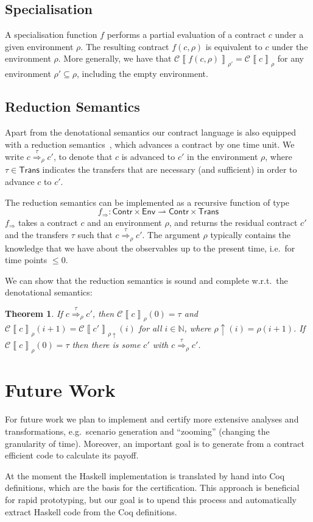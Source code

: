 \documentclass[a4paper,debug,twocolumn]{easychair}
\newcommand\type[1]{\mathsf{#1}}
\newcommand\nats{{\mathbb N}}
\newcommand\pto{\rightharpoonup}
\newcommand\cSem[2]{{\mathcal C}\left\llbracket#1\right\rrbracket_{#2}}
\newcommand\cRed[2]{\stackrel{#2}\Rightarrow_{#1}}
\newcommand\cRedFun{f_{\Rightarrow}}
\newcommand\envAdv[1]{#1\uparrow}
\theoremstyle{plain}
\newtheorem{theorem}{Theorem}
\begin{document}
\subsection{Specialisation}
\label{sec:specialisation}

A specialisation function $f$ performs a partial evaluation of a
contract $c$ under a given environment $\rho$. The resulting contract
$f(c,\rho)$ is equivalent to $c$ under the environment $\rho$. More
generally, we have that $\cSem{f(c,\rho)}{\rho'} = \cSem c \rho$ for
any environment $\rho' \subseteq \rho$, including the empty
environment.



\subsection{Reduction Semantics}
\label{sec:reduction-semantics}


Apart from the denotational semantics our contract language is also
equipped with a reduction semantics~\cite{andersen06sttt}, which
advances a contract by one time unit. We write $c \cRed \rho \tau c'$,
to denote that $c$ is advanced to $c'$ in the environment $\rho$,
where $\tau \in \type{Trans}$ indicates the transfers that are
necessary (and sufficient) in order to advance $c$ to $c'$.

The reduction semantics can be implemented as a recursive function of
type 
\[
\cRedFun \colon\type{Contr}\times \type{Env} \pto \type{Contr} \times \type{Trans}
\]
$\cRedFun$ takes a contract $c$ and an environment $\rho$, and returns
the residual contract $c'$ and the transfers $\tau$ such that $c
\cRed\rho\tau c'$. The argument $\rho$ typically contains the
knowledge that we have about the observables up to the present time,
i.e.\ for time points $\leq 0$.

We can show that the reduction semantics is sound and complete w.r.t.\
the denotational semantics:
\begin{theorem}
  If $c \cRed\rho\tau c'$, then $\cSem c {\rho} (0) = \tau$ and $\cSem
  c {\rho} (i+1) = \cSem{c'}{\envAdv{\rho}}(i)$ for all $i \in \nats$,
  where $\envAdv{\rho} (i) = \rho(i+1)$. If $\cSem c \rho (0) = \tau$
  then there is some $c'$ with $c \cRed\rho\tau c'$.
\end{theorem}


\section{Future Work}
\label{sec:disc-future-work}

For future work we plan to implement and certify more extensive
analyses and transformations, e.g.\ scenario generation and
``zooming'' (changing the granularity of time). Moreover, an important
goal is to generate from a contract efficient code to calculate its
payoff.


At the moment the Haskell implementation is translated by hand into
Coq definitions, which are the basis for the certification. This
approach is beneficial for rapid prototyping, but our goal is to upend
this process and automatically extract Haskell code from the Coq
definitions.



\end{document}
